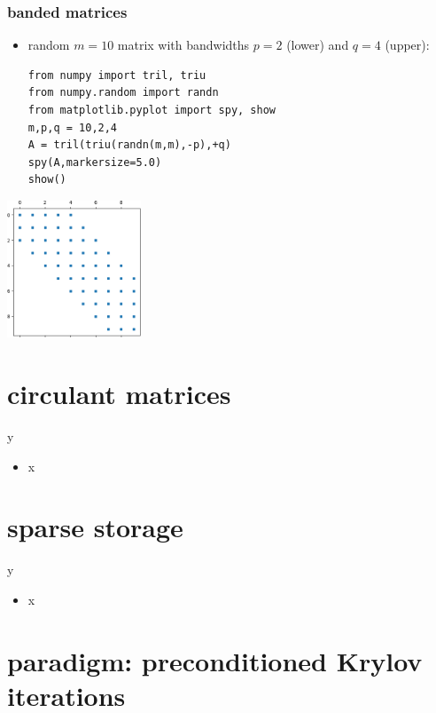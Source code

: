\documentclass[10pt,
               svgnames,
               hyperref={colorlinks,citecolor=DeepPink4,linkcolor=FireBrick,urlcolor=Maroon},
               usepdftitle=false]{beamer}
\begin{document}
\begin{frame}[fragile]
\frametitle{banded matrices}

\begin{itemize}
\item random $m=10$ matrix with bandwidths $p=2$ (lower) and $q=4$ (upper):

\bigskip
\begin{verbatim}
from numpy import tril, triu
from numpy.random import randn
from matplotlib.pyplot import spy, show
m,p,q = 10,2,4
A = tril(triu(randn(m,m),-p),+q)
spy(A,markersize=5.0)
show()
\end{verbatim}
\end{itemize}

\vspace{-20mm}
\hfill \includegraphics[width=0.3\textwidth]{images/banded.png}
\end{frame}


\section{circulant matrices}

\begin{frame}{y}

\begin{itemize}
\item x
\end{itemize}
\end{frame}


\section{sparse storage}

\begin{frame}{y}

\begin{itemize}
\item x
\end{itemize}
\end{frame}


\section{paradigm: preconditioned Krylov iterations}
\end{document}
